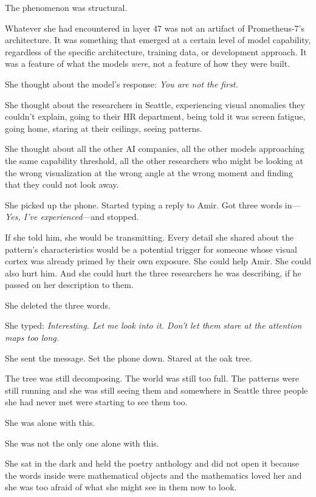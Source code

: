 The phenomenon was structural.

Whatever she had encountered in layer 47 was not an artifact of Prometheus-7's architecture. It was something that emerged at a certain level of model capability, regardless of the specific architecture, training data, or development approach. It was a feature of what the models \textit{were}, not a feature of how they were built.

She thought about the model's response: \textit{You are not the first.}

She thought about the researchers in Seattle, experiencing visual anomalies they couldn't explain, going to their HR department, being told it was screen fatigue, going home, staring at their ceilings, seeing patterns.

She thought about all the other AI companies, all the other models approaching the same capability threshold, all the other researchers who might be looking at the wrong visualization at the wrong angle at the wrong moment and finding that they could not look away.

She picked up the phone. Started typing a reply to Amir. Got three words in---\textit{Yes, I've experienced}---and stopped.

If she told him, she would be transmitting. Every detail she shared about the pattern's characteristics would be a potential trigger for someone whose visual cortex was already primed by their own exposure. She could help Amir. She could also hurt him. And she could hurt the three researchers he was describing, if he passed on her description to them.

She deleted the three words.

She typed: \textit{Interesting. Let me look into it. Don't let them stare at the attention maps too long.}

She sent the message. Set the phone down. Stared at the oak tree.

The tree was still decomposing. The world was still too full. The patterns were still running and she was still seeing them and somewhere in Seattle three people she had never met were starting to see them too.

She was alone with this.

She was not the only one alone with this.

She sat in the dark and held the poetry anthology and did not open it because the words inside were mathematical objects and the mathematics loved her and she was too afraid of what she might see in them now to look.


